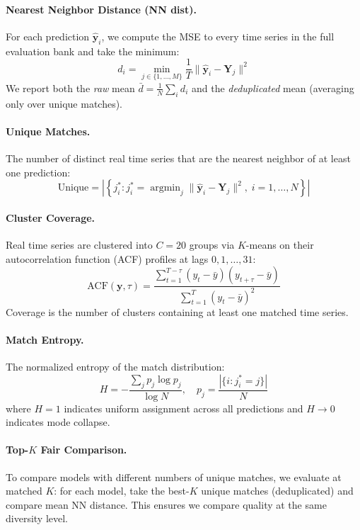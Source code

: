 \documentclass[11pt,a4paper]{article}
\newcommand{\by}{\mathbf{y}}
\newcommand{\bY}{\mathbf{Y}}
\newcommand{\byhat}{\hat{\mathbf{y}}}
\DeclareMathOperator*{\argmin}{argmin}
\begin{document}
\paragraph{Nearest Neighbor Distance (NN dist).}
For each prediction $\byhat_i$, we compute the MSE to every time series in the full evaluation bank and take the minimum:
\begin{equation}
    d_i = \min_{j \in \{1,\ldots,M\}} \frac{1}{T}\|\byhat_i - \bY_j\|^2
\end{equation}
We report both the \emph{raw} mean $\bar{d} = \frac{1}{N}\sum_i d_i$ and the \emph{deduplicated} mean (averaging only over unique matches).

\paragraph{Unique Matches.}
The number of distinct real time series that are the nearest neighbor of at least one prediction:
\begin{equation}
    \text{Unique} = \left|\left\{j^*_i : j^*_i = \argmin_j \|\byhat_i - \bY_j\|^2,\; i = 1, \ldots, N\right\}\right|
\end{equation}

\paragraph{Cluster Coverage.}
Real time series are clustered into $C = 20$ groups via $K$-means on their autocorrelation function (ACF) profiles at lags $0, 1, \ldots, 31$:
\begin{equation}
    \text{ACF}(\by, \tau) = \frac{\sum_{t=1}^{T-\tau}(y_t - \bar{y})(y_{t+\tau} - \bar{y})}{\sum_{t=1}^{T}(y_t - \bar{y})^2}
\end{equation}
Coverage is the number of clusters containing at least one matched time series.

\paragraph{Match Entropy.}
The normalized entropy of the match distribution:
\begin{equation}
    H = -\frac{\sum_j p_j \log p_j}{\log N}, \quad p_j = \frac{|\{i : j^*_i = j\}|}{N}
\end{equation}
where $H = 1$ indicates uniform assignment across all predictions and $H \to 0$ indicates mode collapse.

\paragraph{Top-$K$ Fair Comparison.}
To compare models with different numbers of unique matches, we evaluate at matched $K$: for each model, take the best-$K$ unique matches (deduplicated) and compare mean NN distance.
This ensures we compare quality at the same diversity level.
\end{document}
